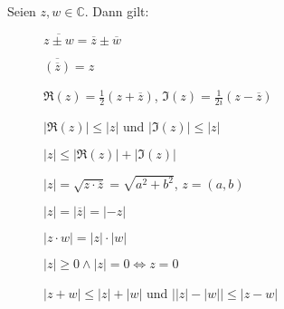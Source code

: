 Seien $z, w \in \mathbb{C}$. Dann gilt: 
\begin{description}
    \item[] $\overline{z \pm w} = \overline{z} \pm \overline{w}$
    \item[] $\overline{(\overline{z})} = z$
    \item[] $\Re(z) = \frac{1}{2}(z+\overline{z})$,
    $\Im(z) = \frac{1}{2i}(z-\overline{z})$
    \item[] $|\Re(z)| \leq |z|$ und
    $|\Im(z)| \leq |z|$
    \item[] $|z| \leq |\Re(z)| + |\Im(z)|$
    \item[] $|z| = \sqrt{z \cdot \overline{z}} = \sqrt{a^2+b^2}$,
    $z = (a, b)$
    \item[] $|z| = |\overline{z}| = |-z|$
    \item[] $|z \cdot w| = |z| \cdot |w|$
    \item[] $|z| \geq 0 \land |z| = 0 \Leftrightarrow z = 0$
    \item[] $|z+w| \leq |z| + |w|$ und $\big||z|-|w|\big| \leq |z-w|$
\end{description}